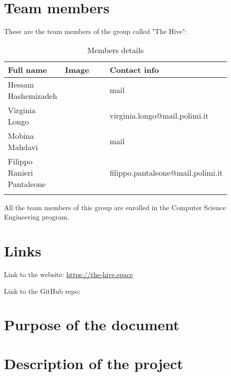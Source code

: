 \section{Team members}
These are the team members of the group called "The Hive":
\begin{longtable}
    {|m{0.2\linewidth}|m{0.2\linewidth}|m{0.5\linewidth}|}
            \hline
            \textbf{Full name} & \textbf{Image} & \textbf{Contact info}\\
            \hline
            \endhead
                Hessam Hashemizadeh &
                \centering
                & mail \\
            \hline
                Virginia Longo  &
                \centering
                & virginia.longo@mail.polimi.it \\
            \hline
                Mobina Mahdavi &
                \centering
                & mail \\
            \hline
                Filippo Ranieri Pantaleone &
                \centering
                & filippo.pantaleone@mail.polimi.it \\
            \hline
            \caption{Members details}
            \label{table:mem_details}
\end{longtable}

All the team members of this group are enrolled in the Computer Science Engineering program.

\section{Links}
Link to the website: \url{https://the-hive.space}

Link to the GitHub repo:

\section{Purpose of the document}

\section{Description of the project}

